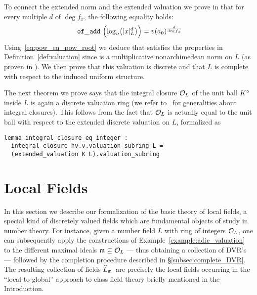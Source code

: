 \documentclass[sigplan,screen]{acmart}
\begin{document}
To connect the extended norm and the extended valuation we prove in \href{https://github.com/mariainesdff/local_fields_journal/blob/7ac213eb804fe7945468023527a0fe26ab23b3c8/src/discrete_valuation_ring/discrete_norm.lean#L158}{\extlink} that for every multiple $d$ of $\deg f_x$, the following equality holds:
\begin{equation}\label{eq:pow_eq_pow_root}
\mathtt{\ of\_add\ }
\Bigl(\log_n\bigl(\lvert x\rvert_L^{d}\bigr)\Bigr)=v(a_0)^\frac{d}{\deg f_x}
\end{equation}
Using~\eqref{eq:pow_eq_pow_root} we deduce that  satisfies the properties in Definition~\ref{def:valuation} since  is a multiplicative nonarchimedean norm on $L$ (as proven in \cite[\S3.2]{deF23}). We then prove that this valuation is discrete\href{https://github.com/mariainesdff/local_fields_journal/blob/7ac213eb804fe7945468023527a0fe26ab23b3c8/src/discrete_valuation_ring/extensions.lean#L447}{\extlink} and that  $L$ is complete with respect to the induced uniform structure\href{https://github.com/mariainesdff/local_fields_journal/blob/7ac213eb804fe7945468023527a0fe26ab23b3c8/src/discrete_valuation_ring/extensions.lean#L561}{\extlink}. 

The next theorem we prove says that the integral closure $\mathcal{O}_{L}$ of the unit ball ${K}^\circ$ inside $L$ is again a discrete valuation ring\href{https://github.com/mariainesdff/local_fields_journal/blob/7ac213eb804fe7945468023527a0fe26ab23b3c8/src/discrete_valuation_ring/extensions.lean#L616}{\extlink} (we refer to~\cite[Chapitre~5, \S2, n$^\circ$1]{Bou85} for generalities about integral closures). This follows from the fact that $\mathcal{O}_{L}$ is actually equal to the unit ball with respect to the extended discrete valuation on $L$, formalized as\href{https://github.com/mariainesdff/local_fields_journal/blob/7ac213eb804fe7945468023527a0fe26ab23b3c8/src/discrete_valuation_ring/extensions.lean#L588}{\extlink}
\begin{lstlisting}
lemma integral_closure_eq_integer :
  integral_closure hv.v.valuation_subring L =
  (extended_valuation K L).valuation_subring
\end{lstlisting}

\section{Local Fields}\label{sec:local_fields}
In this section we describe our formalization of the basic theory of local fields, a special kind of discretely valued fields which are fundamental objects of study in number theory. For instance, given a number field $L$ with ring of integers $\mathcal{O}_{L}$, one can subsequently apply the constructions of Example~\ref{example:adic_valuation} to the different maximal ideals $\maxid[\empty]\subseteq\rint{L}$ --- thus obtaining a collection of DVR's --- followed by the completion procedure described in \S\ref{subsec:complete_DVR}. The resulting collection of fields $\compl[{\maxid[\empty]}]{L}$ are precisely the local fields occurring in the ``local-to-global'' approach to class field theory briefly mentioned in the Introduction.
\end{document}
